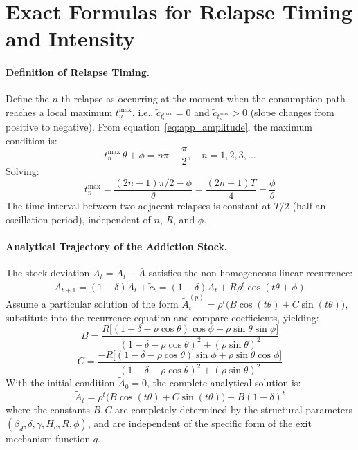 \documentclass[12pt]{article}
\begin{document}
\section{Exact Formulas for Relapse Timing and Intensity}
\label{app:relapse_timing}


\paragraph{Definition of Relapse Timing.}
Define the $n$-th relapse as occurring at the moment when the consumption path reaches a local maximum
$t_n^{\max}$, i.e., $\tilde{c}_{t_n^{\max}} = 0$ and
$\tilde{c}_{t_n^{\max}} > 0$ (slope changes from positive to negative).
From equation~\eqref{eq:app_amplitude}, the maximum condition is:
\begin{equation}
t_n^{\max}\,\theta + \phi = n\pi - \frac{\pi}{2},
\quad n = 1, 2, 3, \ldots
\end{equation}
Solving:
\begin{equation}\label{eq:app_relapse_time}
t_n^{\max} = \frac{(2n-1)\pi/2 - \phi}{\theta}
= \frac{(2n-1)T}{4} - \frac{\phi}{\theta}
\end{equation}
The time interval between two adjacent relapses is constant at $T/2$ (half an oscillation period),
independent of $n$, $R$, and $\phi$.

\paragraph{Analytical Trajectory of the Addiction Stock.}
The stock deviation $\tilde{A}_t = A_t - \bar{A}$ satisfies the non-homogeneous linear recurrence:
\begin{equation}\label{eq:A_recursive}
\tilde{A}_{t+1} = (1-\delta)\tilde{A}_t + \tilde{c}_t
= (1-\delta)\tilde{A}_t + R\rho^t\cos(t\theta+\phi)
\end{equation}
Assume a particular solution of the form $\tilde{A}_t^{(p)} = \rho^t\bigl(B\cos(t\theta) + C\sin(t\theta)\bigr)$,
substitute into the recurrence equation and compare coefficients, yielding:
\begin{equation}\label{eq:B}
B = \frac{R\bigl[(1-\delta-\rho\cos\theta)\cos\phi
    - \rho\sin\theta\sin\phi\bigr]}
   {(1-\delta-\rho\cos\theta)^2 + (\rho\sin\theta)^2}
\end{equation}
\begin{equation}\label{eq:C}
C = \frac{-R\bigl[(1-\delta-\rho\cos\theta)\sin\phi
    + \rho\sin\theta\cos\phi\bigr]}
   {(1-\delta-\rho\cos\theta)^2 + (\rho\sin\theta)^2}
\end{equation}
With the initial condition $\tilde{A}_0 = 0$, the complete analytical solution is:
\begin{equation}\label{eq:A_analytical}
\tilde{A}_t = \rho^t\bigl(B\cos(t\theta) + C\sin(t\theta)\bigr)
- B(1-\delta)^t
\end{equation}
where the constants $B, C$ are completely determined by the structural parameters $(\beta_d, \delta, \gamma, H_c, R, \phi)$,
and are independent of the specific form of the exit mechanism function $q$.
\end{document}
